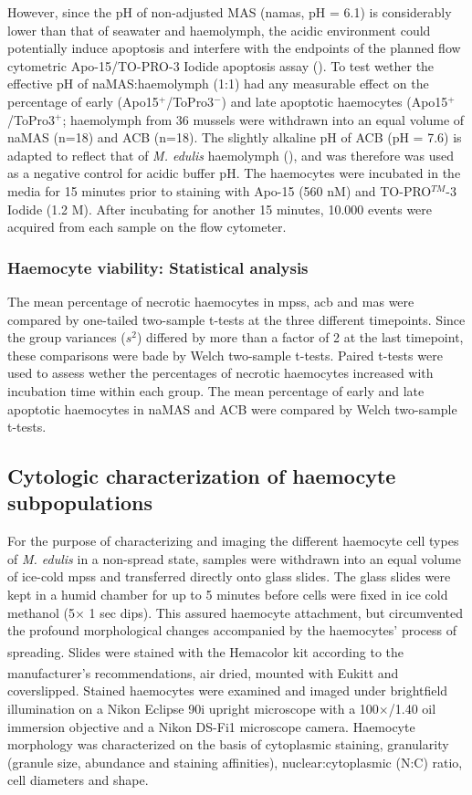 However, since the pH of non-adjusted MAS (\acrshort{namas}, pH = 6.1) is considerably lower than that of seawater and haemolymph, the acidic environment could potentially induce apoptosis and interfere with the endpoints of the planned flow cytometric Apo-15/TO-PRO-3 Iodide apoptosis assay (\cite{Wang2016}). To test wether the effective pH of naMAS:haemolymph (1:1) had any measurable effect on the percentage of early (Apo15$^{+}$/ToPro3$^{-}$) and late apoptotic haemocytes (Apo15$^{+}$/ToPro3$^{+}$; haemolymph from 36 mussels were withdrawn into an equal volume of naMAS (n=18) and ACB (n=18). The slightly alkaline pH of ACB (pH = 7.6) is adapted to reflect that of \emph{M. edulis} haemolymph (\cite{Pipe1997, Mangan2019}), and was therefore was used as a negative control for acidic buffer pH. The haemocytes were incubated in the media for 15 minutes prior to staining with Apo-15 (560 nM) and TO-PRO$^{TM}$-3 Iodide (1.2 \micro M). After incubating for another 15 minutes, 10.000 events were acquired from each sample on the flow cytometer.

\subsubsection{Haemocyte viability: Statistical analysis}
The mean percentage of necrotic haemocytes in \acrshort{mpss}, \acrshort{acb} and \acrshort{mas} were compared by one-tailed two-sample t-tests at the three different timepoints. Since the group variances ($s^{2}$) differed by more than a factor of 2 at the last timepoint, these comparisons were bade by Welch two-sample t-tests. Paired t-tests were used to assess wether the percentages of necrotic haemocytes increased with incubation time within each group. The mean percentage of early and late apoptotic haemocytes in naMAS and ACB were compared by Welch two-sample t-tests.

\subsection{Cytologic characterization of haemocyte subpopulations}
\label{subsection:morph}
For the purpose of characterizing and imaging the different haemocyte cell types of \emph{M. edulis} in a non-spread state, samples were withdrawn into an equal volume of ice-cold \acrshort{mpss} and transferred directly onto glass slides. The glass slides were kept in a humid chamber for up to 5 minutes before cells were fixed in ice cold methanol (5$\times$ 1 sec dips). This assured haemocyte attachment, but circumvented the profound morphological changes accompanied by the haemocytes’ process of spreading. Slides were stained with the Hemacolor\textsuperscript{\textregistered} kit according to the manufacturer’s recommendations, air dried, mounted with Eukitt\textsuperscript{\textregistered} and coverslipped. Stained haemocytes were examined and imaged under brightfield illumination on a Nikon Eclipse 90i upright microscope with a 100$\times$/1.40 oil immersion objective and a Nikon DS-Fi1 microscope camera. Haemocyte morphology was characterized on the basis of cytoplasmic staining, granularity (granule size, abundance and staining affinities), nuclear:cytoplasmic (N:C) ratio, cell diameters and shape. 

